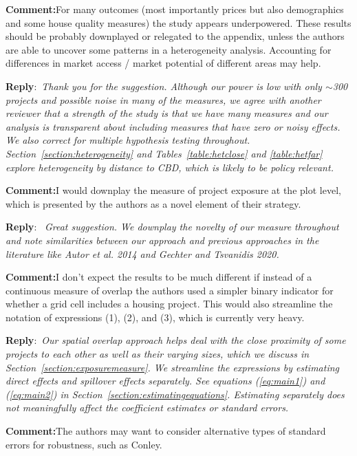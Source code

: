 \documentclass{article}
\newcounter{reviewer}
\newcommand{\reply}{\medskip \noindent \textbf{Reply}:\ \textit }
\newcommand{\sr}{\begin{minipage}{\dimexpr\textwidth-3cm}}
\newcommand{\er}{\end{minipage}}
\newcommand{\cc}{\medskip \noindent \textbf{Comment:}\hspace{2em}}
\begin{document}
\cc For many outcomes (most importantly prices but also demographics and some house quality measures) the study appears underpowered. These results should be probably downplayed or relegated to the appendix, unless the authors are able to uncover some patterns in a heterogeneity analysis. Accounting for differences in market access / market potential of different areas may help.

\sr
\reply{Thank you for the suggestion.  Although our power is low with only $\sim$300 projects and possible noise in many of the measures, we agree with another reviewer that a strength of the study is that we have many measures and our analysis is transparent about including measures that have zero or noisy effects.  We also correct for multiple hypothesis testing throughout.  Section~\ref{section:heterogeneity} and Tables~\ref{table:hetclose} and \ref{table:hetfar} explore heterogeneity by distance to CBD, which is likely to be policy relevant.}\\
\er

\cc I would downplay the measure of project exposure at the plot level, which is presented by the authors as a novel element of their strategy.

\sr
\reply{ Great suggestion.  We downplay the novelty of our measure throughout and note similarities between our approach and previous approaches in the literature like Autor et al. 2014 and Gechter and Tsvanidis 2020. }\\
\er

\cc I don’t expect the results to be much different if instead of a continuous measure of overlap the authors used a simpler binary indicator for whether a grid cell includes a housing project. This would also streamline the notation of expressions (1), (2), and (3), which is currently very heavy.

\sr
\reply{Our spatial overlap approach helps deal with the close proximity of some projects to each other as well as their varying sizes, which we discuss in Section~\ref{section:exposuremeasure}.  We streamline the expressions by estimating direct effects and spillover effects separately.  See equations (\ref{eq:main1}) and (\ref{eq:main2}) in Section~\ref{section:estimatingequations}.  Estimating separately does not meaningfully affect the coefficient estimates or standard errors.  }\\
\er

\cc The authors may want to consider alternative types of standard errors for robustness, such as Conley.
\end{document}
